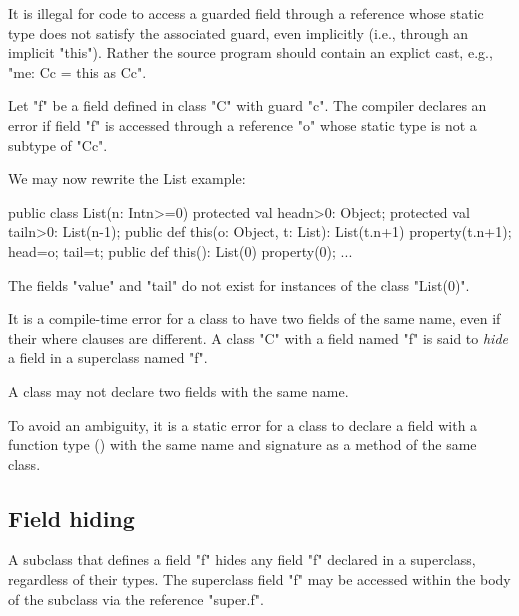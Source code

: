 It is illegal for code to access a guarded field through a reference
whose static type does not satisfy the associated guard, even
implicitly (i.e., through an implicit \xcd"this"). Rather the source
program should contain an explict cast, e.g., \xcd"me: C{c} = this as C{c}".

\begin{staticrule*}
Let \xcd"f" be a field defined in class
\xcd"C" with guard \xcd"c".  The compiler declares an error if
field \xcd"f" is accessed through a reference \xcd"o" whose static
type is not a subtype of \xcd"C{c}".
\end{staticrule*}

\begin{example}

We may now rewrite the List example:
\begin{xten}
public class List(n: Int{n>=0}) {
  protected val head{n>0}: Object;
  protected val tail{n>0}: List(n-1);
  public def this(o: Object, t: List): List(t.n+1) {
     property(t.n+1);
     head=o;
     tail=t;
  }
  public def this(): List(0) {
     property(0);
  }
  ...
}
\end{xten}

The fields \xcd"value" and \xcd"tail" do not exist for instances of the class
\xcd"List(0)".
\end{example}

It is a compile-time error for a class to have two fields of the same
name, even if their where clauses are different. A class \xcd"C" with a field
named \xcd"f" is said to {\em hide} a field in a superclass named \xcd"f".

\begin{staticrule*}
     A class may not declare two fields with the same name.
\end{staticrule*}

To avoid an ambiguity, it is a static error for a class to
declare a field with a function type () with
the same name and signature  as a method of the same class.

\subsection{Field hiding}

A subclass that defines a field \xcd"f" hides any field \xcd"f"
declared in a superclass, regardless of their types.  The
superclass field \xcd"f" may be accessed within the body of
the subclass via the reference \xcd"super.f".


